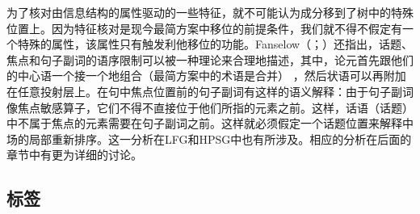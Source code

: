 为了核对由信息结构的属性驱动的一些特征，就不可能认为成分移到了树中的特殊位置上。因为特征核对是现今最简方案中移位的前提条件，我们就不得不假定有一个特殊的属性，该属性只有触发利他移位的功能。Fanselow（\citeyear[\S~4]{Fanselow2003b}；\citeyear[]{Fanselow2006a}）还指出，话题、焦点和句子副词的语序限制可以被一种理论来合理地描述，其中，论元首先跟他们的中心语一个接一个地组合（最简方案中的术语是合并）
，然后状语可以再附加在任意投射层上。在句中焦点位置前的句子副词有这样的语义解释：由于句子副词像焦点敏感算子，它们不得不直接位于他们所指的元素之前。这样，话语（话题）中不属于焦点的元素需要在句子副词之前。这样就必须假定一个话题位置来解释中场的局部重新排序。这一分析在LFG\indexlfgc 和HPSG\indexhpsgc 中也有所涉及。相应的分析在后面的章节中有更为详细的讨论。
%

\subsection{标签}
\label{Abschnitt-Labeling}

